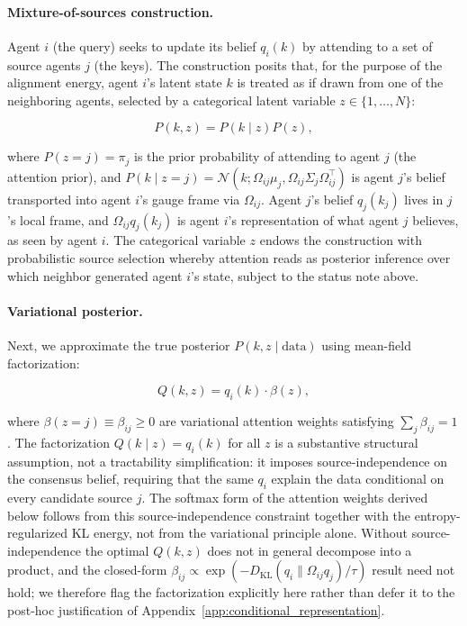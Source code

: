 \documentclass[11pt]{article}
\begin{document}
\paragraph{Mixture-of-sources construction.}
Agent $i$ (the query) seeks to update its belief $q_i(k)$ by attending to a set of source agents $j$ (the keys). The construction posits that, for the purpose of the alignment energy, agent $i$'s latent state $k$ is treated as if drawn from one of the neighboring agents, selected by a categorical latent variable $z \in \{1, \ldots, N\}$:

\begin{equation}
P(k, z) = P(k \mid z) P(z),
\label{eq:mixture_joint}
\end{equation}

where $P(z = j) = \pi_j$ is the prior probability of attending to agent $j$ (the attention prior), and $P(k \mid z = j) = \mathcal{N}(k; \Omega_{ij}\mu_j, \Omega_{ij}\Sigma_j\Omega_{ij}^\top)$ is agent $j$'s belief transported into agent $i$'s gauge frame via $\Omega_{ij}$. Agent $j$'s belief $q_j(k_j)$ lives in $j$'s local frame, and $\Omega_{ij}q_j(k_j)$ is agent $i$'s representation of what agent $j$ believes, as seen by agent $i$. The categorical variable $z$ endows the construction with probabilistic source selection whereby attention reads as posterior inference over which neighbor generated agent $i$'s state, subject to the status note above.

\paragraph{Variational posterior.}
Next, we approximate the true posterior $P(k, z \mid \text{data})$ using mean-field factorization:

\begin{equation}
Q(k, z) = q_i(k) \cdot \beta(z),
\label{eq:mixture_posterior}
\end{equation}

where $\beta(z = j) \equiv \beta_{ij} \geq 0$ are variational attention weights satisfying $\sum_j \beta_{ij} = 1$. The factorization $Q(k \mid z) = q_i(k)$ for all $z$ is a substantive structural assumption, not a tractability simplification: it imposes source-independence on the consensus belief, requiring that the same $q_i$ explain the data conditional on every candidate source $j$. The softmax form of the attention weights derived below follows from this source-independence constraint together with the entropy-regularized KL energy, not from the variational principle alone. Without source-independence the optimal $Q(k, z)$ does not in general decompose into a product, and the closed-form $\beta_{ij} \propto \exp(-D_{\mathrm{KL}}(q_i \| \Omega_{ij}q_j)/\tau)$ result need not hold; we therefore flag the factorization explicitly here rather than defer it to the post-hoc justification of Appendix~\ref{app:conditional_representation}.
\end{document}
